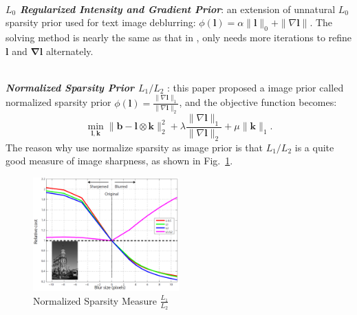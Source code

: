 \documentclass[journal, onecolumn, 10pt]{IEEEtran}
\begin{document}
~\\
\textbf{\emph{$L_0$ Regularized Intensity and Gradient Prior}}\cite{pan2014deblurring}: an extension of unnatural $L_0$ sparsity prior\cite{xu2013unnatural} used for text image deblurring: $\phi(\mathbf{l}) = \alpha\| \mathbf{l} \|_0 + \|\nabla \mathbf{l} \|$. The solving method is nearly the same as that in \cite{xu2013unnatural}, only needs more iterations to refine $\mathbf{l}$ and $\mathbf{\nabla \mathbf{l}}$ alternately.

~\\
\textbf{\emph{Normalized Sparsity Prior $L_1/L_2$}} \cite{krishnan2011blind}: this paper proposed a image prior called normalized sparsity prior $\phi(\mathbf{l}) = \frac{\|\nabla\mathbf{l}\|_1}{\|\nabla\mathbf{l}\|_2}$, and the objective function becomes:
\begin{equation}
\min_{\mathbf{l}, \mathbf{k}} \|\mathbf{b} - \mathbf{l} \otimes \mathbf{k} \|_2^2 + \lambda \frac{\|\nabla\mathbf{l}\|_1}{\|\nabla\mathbf{l}\|_2} + \mu \|\mathbf{k}\|_1.
\label{eqn:normalized_sparisty}
\end{equation}
The reason why use normalize sparsity as image prior is that $L_1/L_2$ is a quite good measure of image sharpness, as shown in Fig.~\ref{fig:normalized_sparisty}.
\begin{figure}[h!]
\centering
\includegraphics[width = 0.5\textwidth]{pic/normalized_sparsity.png}
\caption{Normalized Sparsity Measure $\frac{L_1}{L_2}$}
\label{fig:normalized_sparisty}
\end{figure}
\end{document}
